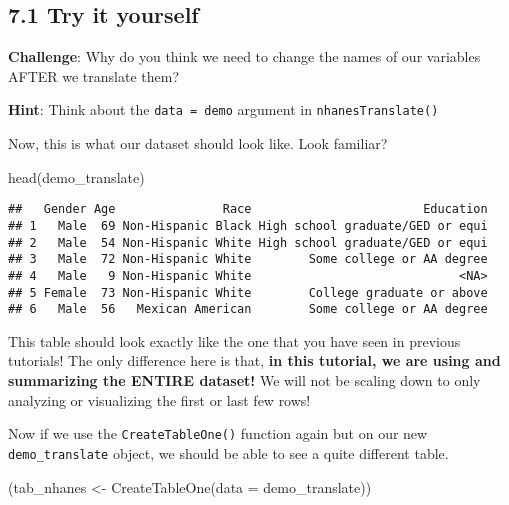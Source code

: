 \documentclass[
]{book}
\newenvironment{Shaded}{\begin{snugshade}}{\end{snugshade}}
\newcommand{\AttributeTok}[1]{\textcolor[rgb]{0.77,0.63,0.00}{#1}}
\newcommand{\FunctionTok}[1]{\textcolor[rgb]{0.00,0.00,0.00}{#1}}
\newcommand{\NormalTok}[1]{#1}
\newcommand{\OtherTok}[1]{\textcolor[rgb]{0.56,0.35,0.01}{#1}}
\begin{document}
\hypertarget{try-it-yourself-34}{%
\subsection{7.1 Try it yourself}\label{try-it-yourself-34}}

\textbf{Challenge}: Why do you think we need to change the names of our variables AFTER we translate them?

\textbf{Hint}: Think about the \texttt{data\ =\ demo} argument in \texttt{nhanesTranslate()}

Now, this is what our dataset should look like. Look familiar?

\begin{Shaded}
\begin{Highlighting}[]
\FunctionTok{head}\NormalTok{(demo\_translate)}
\end{Highlighting}
\end{Shaded}

\begin{verbatim}
##   Gender Age               Race                        Education
## 1   Male  69 Non-Hispanic Black High school graduate/GED or equi
## 2   Male  54 Non-Hispanic White High school graduate/GED or equi
## 3   Male  72 Non-Hispanic White        Some college or AA degree
## 4   Male   9 Non-Hispanic White                             <NA>
## 5 Female  73 Non-Hispanic White        College graduate or above
## 6   Male  56   Mexican American        Some college or AA degree
\end{verbatim}

This table should look exactly like the one that you have seen in previous tutorials! The only difference here is that, \textbf{in this tutorial, we are using and summarizing the ENTIRE dataset!} We will not be scaling down to only analyzing or visualizing the first or last few rows!

Now if we use the \texttt{CreateTableOne()} function again but on our new \texttt{demo\_translate} object, we should be able to see a quite different table.

\begin{Shaded}
\begin{Highlighting}[]
\NormalTok{(tab\_nhanes }\OtherTok{\textless{}{-}} \FunctionTok{CreateTableOne}\NormalTok{(}\AttributeTok{data =}\NormalTok{ demo\_translate))}
\end{Highlighting}
\end{Shaded}
\end{document}
